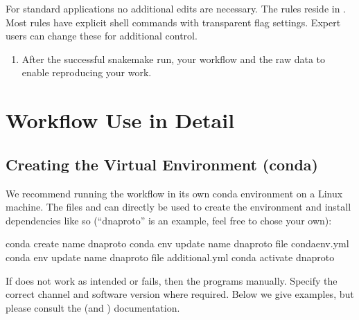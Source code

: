 \documentclass[letterpaper,10pt,english]{sphinxhowto}
\begin{document}
For standard applications no additional edits are necessary. The rules reside in . Most rules have explicit shell commands with transparent flag settings. Expert users can change these for additional control.
\begin{enumerate}
%
\setcounter{enumi}{11}
\item {} 
After the successful snakemake run,  your workflow and the raw data to enable reproducing your work.

\end{enumerate}


\section{Workflow Use in Detail}
\label{\detokenize{index:workflow-use-in-detail}}

\subsection{Creating the Virtual Environment (conda)}
\label{\detokenize{index:creating-the-virtual-environment-conda}}
We recommend running the workflow in its own conda environment on a Linux machine. The files  and  can directly be used to create the environment and install dependencies like so (“dna\sphinxhyphen{}proto” is an example, feel free to chose your own):

\begin{sphinxVerbatim}[commandchars=\\\{\}]
\PYGZdl{} conda create \PYGZhy{}\PYGZhy{}name dna\PYGZhy{}proto
\PYGZdl{} conda env update \PYGZhy{}\PYGZhy{}name dna\PYGZhy{}proto \PYGZhy{}\PYGZhy{}file condaenv.yml
\PYGZdl{} conda env update \PYGZhy{}\PYGZhy{}name dna\PYGZhy{}proto \PYGZhy{}\PYGZhy{}file additional.yml
\PYGZdl{} conda activate dna\PYGZhy{}proto
\end{sphinxVerbatim}

If  does not work as intended or fails, then  the programs manually. Specify the correct channel and software version where required. Below we give examples, but please consult the  (and ) documentation.
\end{document}
